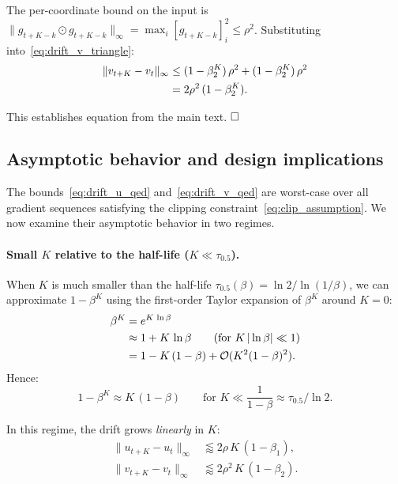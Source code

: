 \documentclass{article}
\begin{document}
The per-coordinate bound on the input is
$\|g_{t+K-k} \odot g_{t+K-k}\|_\infty = \max_i [g_{t+K-k}]_i^2 \leq \rho^2$.
Substituting into~\eqref{eq:drift_v_triangle}:
\begin{align}
\|v_{t+K} - v_t\|_\infty
&\leq (1-\beta_2^K)\,\rho^2 + (1-\beta_2^K)\,\rho^2
\notag \\
&= 2\rho^2\,(1-\beta_2^K).
\label{eq:drift_v_qed}
\end{align}

This establishes equation from the main text. $\hfill\square$

\subsection{Asymptotic behavior and design implications}
\label{sec:drift_asymptotics}

The bounds~\eqref{eq:drift_u_qed} and~\eqref{eq:drift_v_qed} are
worst-case over all gradient sequences satisfying the clipping
constraint~\eqref{eq:clip_assumption}. We now examine their asymptotic
behavior in two regimes.

\paragraph{Small $K$ relative to the half-life ($K \ll \tau_{0.5}$).}

When $K$ is much smaller than the half-life
$\tau_{0.5}(\beta) = \ln 2 / \ln(1/\beta)$, we can approximate
$1 - \beta^K$ using the first-order Taylor expansion of $\beta^K$
around $K = 0$:
\begin{align}
\beta^K
&= e^{K\,\ln\beta} \notag \\
&\approx 1 + K\,\ln\beta
\qquad\text{(for $K\,|\ln\beta| \ll 1$)} \notag \\
&= 1 - K\,(1-\beta) + \mathcal{O}(K^2(1-\beta)^2).
\label{eq:drift_taylor}
\end{align}
Hence:
\begin{equation}
1 - \beta^K \approx K\,(1-\beta)
\qquad\text{for } K \ll \frac{1}{1-\beta} \approx \tau_{0.5}/\ln 2.
\label{eq:drift_linear}
\end{equation}

In this regime, the drift grows \emph{linearly} in $K$:
\begin{align}
\|u_{t+K} - u_t\|_\infty &\lessapprox 2\rho\,K\,(1-\beta_1),
\label{eq:drift_u_linear} \\
\|v_{t+K} - v_t\|_\infty &\lessapprox 2\rho^2\,K\,(1-\beta_2).
\label{eq:drift_v_linear}
\end{align}
\end{document}
